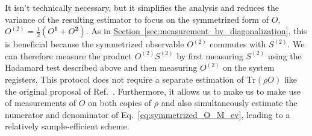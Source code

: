 \documentclass[
amsmath,
amssymb,
aps,
pra,
reprint,
twocolumn,
superscriptaddress,
longbibliography,
showkeys,
floatfix
]{revtex4-1}
\def\ket#1{\ensuremath{\mathinner{|{#1}\rangle}}}
\def\tr{\mathrm{Tr}}
\newcommand{\eq}[1]{Eq.~\hyperref[eq:#1]{\ref*{eq:#1}}}
\renewcommand{\sec}[1]{\hyperref[sec:#1]{Section~\ref*{sec:#1}}}
\begin{document}
It isn't technically necessary, but it simplifies the analysis and reduces the
variance of the resulting estimator to focus on the symmetrized form of \(O\),
\(O^{(2)} = \frac{1}{2}(O^\textbf{1} + O^\textbf{2})\). 
As in \sec{measurement_by_diagonalization}, this is beneficial because the
symmetrized observable \(O^{(2)}\) commutes with \(S^{(2)}\). 
We can therefore measure the product \(O^{(2)} S^{(2)}\) by first measuring
\(S^{(2)}\) using the Hadamard test described above and then measuring
\(O^{(2)}\) on the system registers. 
This protocol does not require a separate estimation of \(\tr(\rho O)\) like the
original proposal of Ref.~. 
Furthermore, it allows us to make us to make use of measurements of \(O\) on
both copies of \(\rho\) and also simultaneously estimate the numerator and
denominator of \eq{symmetrized_O_M_ev}, leading to a relatively sample-efficient scheme.

\end{document}

